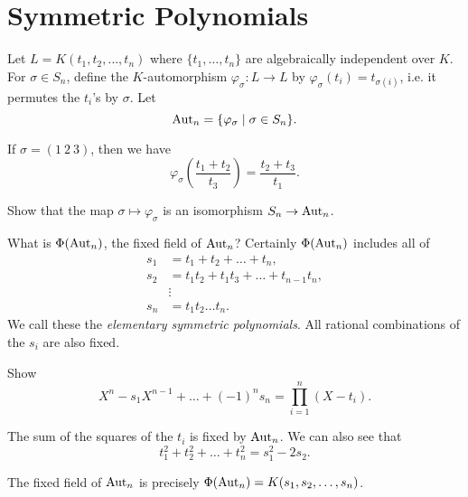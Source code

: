 \section{Symmetric Polynomials}

\begin{definition}
  Let $L = K(t_1, t_2, \dots, t_n)$ where
  $\{t_1, \dots, t_n\}$ are algebraically independent
  over $K$. For $\sigma \in S_n$, define the
  $K$-automorphism $\varphi_\sigma : L \to L$
  by $\varphi_\sigma(t_i) = t_{\sigma(i)}$, i.e. it
  permutes the $t_i$'s by $\sigma$.
  Let
  \[
    \operatorname{Aut}_n = \{\varphi_\sigma \mid \sigma \in S_n\}.
  \]
\end{definition}

\begin{example}
  If $\sigma = (1\ 2\ 3)$, then we have
  \[
    \varphi_\sigma \left(\frac{t_1 + t_2}{t_3}\right)
    = \frac{t_2 + t_3}{t_1}.
  \]
\end{example}

\begin{exercise}
  Show that the map $\sigma \mapsto \varphi_\sigma$
  is an isomorphism $S_n \to \operatorname{Aut}_n$.
\end{exercise}

\begin{example}
  What is $\Phi(\operatorname{Aut}_n)$, the fixed field of $\operatorname{Aut}_n$?
  Certainly $\Phi(\operatorname{Aut}_n)$ includes all of
  \begin{align*}
    s_1 &= t_1 + t_2 + \dots + t_n, \\
    s_2 &= t_1t_2 + t_1t_3 + \dots + t_{n - 1}t_n, \\
    & \vdots \\
    s_n &= t_1t_2 \dots t_n.
  \end{align*}
  We call these the
  \emph{elementary symmetric polynomials}. All rational
  combinations of the $s_i$ are also fixed.
\end{example}

\begin{exercise}
  Show
  \[
    X^n - s_1 X^{n - 1} + \dots + (-1)^n s_n
    = \prod_{i = 1}^n (X - t_i).
  \]
\end{exercise}

\begin{example}
  The sum of the squares of the $t_i$ is fixed by
  $\operatorname{Aut}_n$. We can also see that
  \[
    t_1^2 + t_2^2 + \dots + t_n^2 = s_1^2 - 2s_2.
  \]
\end{example}

\begin{theorem}
  The fixed field of $\operatorname{Aut}_n$ is precisely
  $\Phi(\operatorname{Aut}_n) = K(s_1, s_2, \dots, s_n)$.
\end{theorem}

